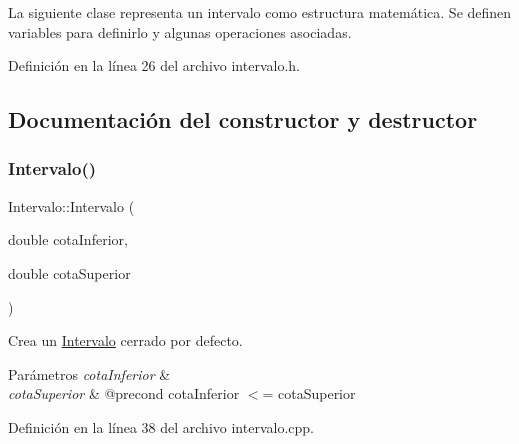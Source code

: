 La siguiente clase representa un intervalo como estructura matemática. Se definen variables para definirlo y algunas operaciones asociadas. 

Definición en la línea 26 del archivo intervalo.\+h.



\subsection{Documentación del constructor y destructor}
\mbox{\label{classIntervalo_a321e56ef7e1f4a774bd64cc2609156f4}} 
\subsubsection{\texorpdfstring{Intervalo()}{Intervalo()}\hspace{0.1cm}{\footnotesize\ttfamily [1/2]}}
{\footnotesize\ttfamily Intervalo\+::\+Intervalo (\begin{DoxyParamCaption}\item[{double}]{cota\+Inferior,  }\item[{double}]{cota\+Superior }\end{DoxyParamCaption})}



Crea un \mbox{\hyperlink{classIntervalo}{Intervalo}} cerrado por defecto. 


\begin{DoxyParams}{Parámetros}
{\em cota\+Inferior} & \\
\hline
{\em cota\+Superior} & @precond cota\+Inferior $<$= cota\+Superior \\
\hline
\end{DoxyParams}


Definición en la línea 38 del archivo intervalo.\+cpp.


\begin{DoxyCode}{0}

\end{DoxyCode}
\mbox{\label{classIntervalo_af70d523399465f51862977a303656c72}} 
